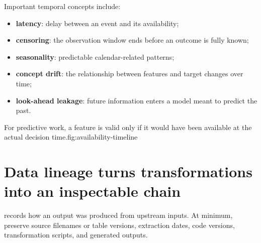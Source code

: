 Important temporal concepts include:
\begin{itemize}
  \item \textbf{latency}: delay between an event and its availability;
  \item \textbf{censoring}: the observation window ends before an outcome is fully known;
  \item \textbf{seasonality}: predictable calendar-related patterns;
  \item \textbf{concept drift}: the relationship between features and target changes over time;
  \item \textbf{look-ahead leakage}: future information enters a model meant to predict the past.
\end{itemize}

\begin{utpfig}{For predictive work, a feature is valid only if it would have been available at the actual decision time.}{fig:availability-timeline}
\end{utpfig}

\section{Data lineage turns transformations into an inspectable chain}
 records how an output was produced from upstream inputs. At minimum, preserve source filenames or table versions, extraction dates, code versions, transformation scripts, and generated outputs.

